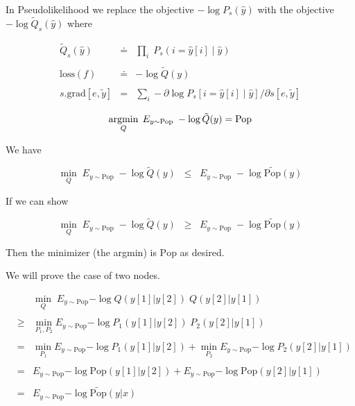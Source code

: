 {In Pseudolikelihood we replace the objective $- \log P_s(\hat{y})$ with the objective $- \log \tilde{Q}_s(\hat{y})$ where

\vfill
\begin{eqnarray*}
  \tilde{Q}_s(\hat{y}) & \doteq & \prod_i \;P_s(i = \hat{y}[i] \;|\;\hat{y}) \\
  \\
  \mathrm{loss}(f) & \doteq & - \log \tilde{Q}(y) \\
  \\
  s.\mathrm{grad}[e,\tilde{y}] & = & \sum_i - \partial \log P_s[i = \hat{y}[i] \;|\;\hat{y}] /\partial s[e,\tilde{y}]
\end{eqnarray*}



$$\operatorname*{argmin}_Q \; E_{y \sim \mathrm{Pop}} \;-\log \tilde{Q}(y) = \mathrm{Pop}$$

\vfill


We have

$$\min_{Q} \;E_{y \sim \mathrm{Pop}}\;-\log \tilde{Q}(y) \;\;\leq \;\; E_{y \sim \mathrm{Pop}}\;-\log \widetilde{\mathrm{Pop}}(y)$$

\vfill
If we can show

$$\min_{Q} \;E_{y \sim \mathrm{Pop}}\;-\log \tilde{Q}(y) \;\;\geq \;\; E_{y \sim \mathrm{Pop}}\;-\log \widetilde{\mathrm{Pop}}(y)$$

Then the minimizer (the argmin) is $\mathrm{Pop}$ as desired.


We will prove the case of two nodes.

\vfill
\begin{eqnarray*}
  & & \min_Q \;E_{y\sim \mathrm{Pop}}{-\log Q(y[1]|y[2])\;Q(y[2]|y[1])} \\
  \\
  & \geq & \min_{P_1,P_2} E_{y \sim \mathrm{Pop}}{-\log P_1(y[1]|y[2])\;P_2(y[2]|y[1])} \\
  \\
  & = & \min_{P_1} E_{y \sim \mathrm{Pop}}{-\log P_1(y[1]|y[2])} + \min_{P_2} E_{y \sim \mathrm{Pop}}{-\log P_2(y[2]|y[1])} \\
  \\
  & = & E_{y \sim \mathrm{Pop}}{-\log \mathrm{Pop}(y[1]|y[2])} + E_{y \sim \mathrm{Pop}}{-\log \mathrm{Pop}(y[2]|y[1])} \\
  \\
  & = & E_{y \sim \mathrm{Pop}}{-\log \widetilde{\mathrm{Pop}}(y|x)}
\end{eqnarray*}

}
